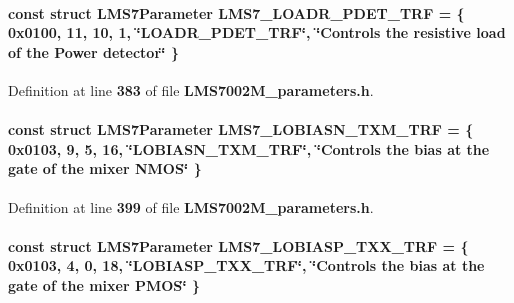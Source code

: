 \paragraph[{L\+M\+S7\+\_\+\+L\+O\+A\+D\+R\+\_\+\+P\+D\+E\+T\+\_\+\+T\+RF}]{\setlength{\rightskip}{0pt plus 5cm}const struct {\bf L\+M\+S7\+Parameter} L\+M\+S7\+\_\+\+L\+O\+A\+D\+R\+\_\+\+P\+D\+E\+T\+\_\+\+T\+RF = \{ 0x0100, 11, 10, 1, \char`\"{}\+L\+O\+A\+D\+R\+\_\+\+P\+D\+E\+T\+\_\+\+T\+R\+F\char`\"{}, \char`\"{}\+Controls the resistive load of the Power detector\char`\"{} \}\hspace{0.3cm}{\ttfamily [static]}}\label{LMS7002M__parameters_8h_adc2a3056a4d17c45831c8f21ccd78dc2}


Definition at line {\bf 383} of file {\bf L\+M\+S7002\+M\+\_\+parameters.\+h}.

\paragraph[{L\+M\+S7\+\_\+\+L\+O\+B\+I\+A\+S\+N\+\_\+\+T\+X\+M\+\_\+\+T\+RF}]{\setlength{\rightskip}{0pt plus 5cm}const struct {\bf L\+M\+S7\+Parameter} L\+M\+S7\+\_\+\+L\+O\+B\+I\+A\+S\+N\+\_\+\+T\+X\+M\+\_\+\+T\+RF = \{ 0x0103, 9, 5, 16, \char`\"{}\+L\+O\+B\+I\+A\+S\+N\+\_\+\+T\+X\+M\+\_\+\+T\+R\+F\char`\"{}, \char`\"{}\+Controls the bias at the gate of the mixer N\+M\+O\+S\char`\"{} \}\hspace{0.3cm}{\ttfamily [static]}}\label{LMS7002M__parameters_8h_a341f21e273897480f1f60f2e670a95a5}


Definition at line {\bf 399} of file {\bf L\+M\+S7002\+M\+\_\+parameters.\+h}.

\paragraph[{L\+M\+S7\+\_\+\+L\+O\+B\+I\+A\+S\+P\+\_\+\+T\+X\+X\+\_\+\+T\+RF}]{\setlength{\rightskip}{0pt plus 5cm}const struct {\bf L\+M\+S7\+Parameter} L\+M\+S7\+\_\+\+L\+O\+B\+I\+A\+S\+P\+\_\+\+T\+X\+X\+\_\+\+T\+RF = \{ 0x0103, 4, 0, 18, \char`\"{}\+L\+O\+B\+I\+A\+S\+P\+\_\+\+T\+X\+X\+\_\+\+T\+R\+F\char`\"{}, \char`\"{}\+Controls the bias at the gate of the mixer P\+M\+O\+S\char`\"{} \}\hspace{0.3cm}{\ttfamily [static]}}\label{LMS7002M__parameters_8h_a1f59bc1a6621c65772db23f65e046acb}


